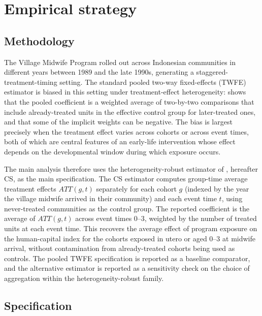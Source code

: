 
\section{Empirical strategy} \label{sec:empirical}

\subsection{Methodology}

The Village Midwife Program rolled out across Indonesian communities in different years between 1989 and the late 1990s, generating a staggered-treatment-timing setting. The standard pooled two-way fixed-effects (TWFE) estimator is biased in this setting under treatment-effect heterogeneity: \textcite{goodmanbacon2021} shows that the pooled coefficient is a weighted average of two-by-two comparisons that include already-treated units in the effective control group for later-treated ones, and that some of the implicit weights can be negative. The bias is largest precisely when the treatment effect varies across cohorts or across event times, both of which are central features of an early-life intervention whose effect depends on the developmental window during which exposure occurs.

The main analysis therefore uses the heterogeneity-robust estimator of \textcite{callawaysantanna2021}, hereafter CS, as the main specification. The CS estimator computes group-time average treatment effects $ATT(g, t)$ separately for each cohort $g$ (indexed by the year the village midwife arrived in their community) and each event time $t$, using never-treated communities as the control group. The reported coefficient is the average of $ATT(g, t)$ across event times $0$--$3$, weighted by the number of treated units at each event time. This recovers the average effect of program exposure on the human-capital index for the cohorts exposed in utero or aged 0--3 at midwife arrival, without contamination from already-treated cohorts being used as controls. The pooled TWFE specification is reported as a baseline comparator, and the alternative \textcite{dechaisemartin2021} estimator is reported as a sensitivity check on the choice of aggregation within the heterogeneity-robust family.

\subsection{Specification}

